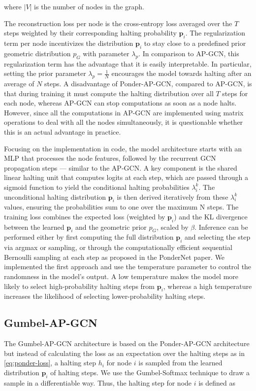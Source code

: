 \documentclass{gdl}
\begin{document}
\noindent where $|V|$ is the number of nodes in the graph.

\noindent The reconstruction loss per node is the cross-entropy loss averaged over the $T$ steps weighted by their corresponding halting probability $\mathbf{p}_i$. The regularization term per node incentivizes the distribution $\mathbf{p}_i$ to stay close to a predefined prior geometric distribution $p_G$ with parameter $\lambda_p$. In comparison to AP-GCN, this regularization term has the advantage that it is easily interpretable. In particular, setting the prior parameter $\lambda_p = \frac{1}{N}$ encourages the model towards halting after an average of $N$ steps. A disadvantage of Ponder-AP-GCN, compared to AP-GCN, is that during training it must compute the halting distribution over all $T$ steps for each node, whereas AP-GCN can stop computations as soon as a node halts. However, since all the computations in AP-GCN are implemented using matrix operations to deal with all the nodes simultaneously, it is questionable whether this is an actual advantage in practice.

Focusing on the implementation in code, the model architecture starts with an MLP that processes the node features, followed by the recurrent GCN propagation steps --- similar to the AP-GCN. A key component is the shared linear halting unit that computes logits at each step, which are passed through a sigmoid function to yield the conditional halting probabilities $\lambda_i^k$. The unconditional halting distribution $\mathbf{p}_i$ is then derived iteratively from these $\lambda_i^k$  values, ensuring the probabilities sum to one over the maximum N steps. The training loss combines the expected loss (weighted by $\mathbf{p}_i$) and the KL divergence between the learned $\mathbf{p}_i$ and the geometric prior $p_G$, scaled by $\beta$. Inference can be performed either by first computing the full distribution $\mathbf{p}_i$ and selecting the step via argmax or sampling, or through the computationally efficient sequential Bernoulli sampling at each step as proposed in the PonderNet paper. We implemented the first approach and use the temperature parameter to control the randomness in the model's output. A low temperature makes the model more likely to select high-probability halting steps from $\mathbf{p}_i$, whereas a high temperature increases the likelihood of selecting lower-probability halting steps.

\subsection{Gumbel-AP-GCN}
The Gumbel-AP-GCN architecture is based on the Ponder-AP-GCN architecture but instead of calculating the loss as an expectation over the halting steps as in \autoref{eq:ponder-loss}, a halting step $h_i$ for node $i$ is sampled from the learned distribution $\mathbf{p}_i$ of halting steps. We use the Gumbel-Softmax technique \cite{Maddison2017, Jang2017} to draw a sample in a differentiable way. Thus, the halting step for node $i$ is defined as
\end{document}
